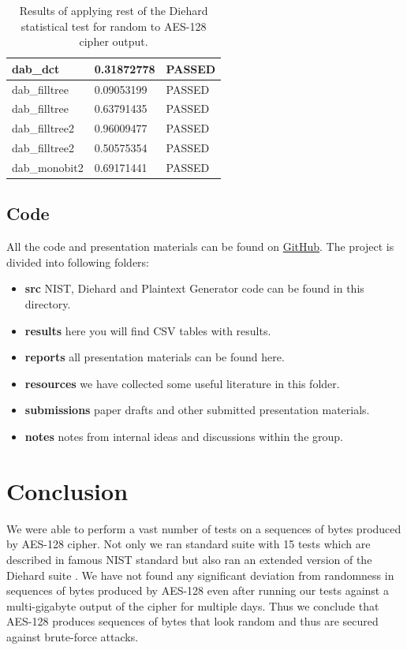 \documentclass[conference]{IEEEtran}
\begin{document}
\begin{center}
\begin{table}[H]
\begin{tabular}{|l|l|l|}
dab\_dct                               & 0.31872778 & PASSED \\ \hline
dab\_filltree                          & 0.09053199 & PASSED \\ \hline
dab\_filltree                          & 0.63791435 & PASSED \\ \hline
dab\_filltree2                         & 0.96009477 & PASSED \\ \hline
dab\_filltree2                         & 0.50575354 & PASSED \\ \hline
dab\_monobit2                          & 0.69171441 & PASSED \\ \hline
\end{tabular}
\caption{Results of applying rest of the Diehard statistical test for random to AES-128 cipher output.}
\label{dieharderesults3}
\end{table}
\end{center}

\subsection{Code}
All the code and presentation materials can be found on \href{https://urlzs.com/kUsF}{GitHub}. The project is divided into following folders:

\begin{itemize}
  \item \textbf{src} NIST, Diehard and Plaintext Generator code can be found in this directory.
  \item \textbf{results} here you will find CSV tables with results.
  \item \textbf{reports} all presentation materials can be found here.
  \item \textbf{resources} we have collected some useful literature in this folder.
  \item \textbf{submissions} paper drafts and other submitted presentation materials.
   \item \textbf{notes} notes from internal ideas and discussions within the group. 
\end{itemize}

\section{Conclusion}
We were able to perform a vast number of tests on a sequences of bytes produced by AES-128 cipher. Not only we ran standard suite with 15 tests which are described in famous NIST standard \cite{nisttests} but also ran an extended version of the Diehard suite \cite{diehardtests}. We have not found any significant deviation from randomness in sequences  of bytes produced by AES-128 even after running our tests against a multi-gigabyte output of the cipher for multiple days. Thus we conclude that AES-128 produces sequences of bytes that look random and thus are secured against brute-force attacks. 
\end{document}
